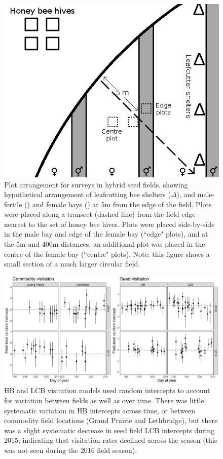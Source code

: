 \documentclass[12pt]{article} %
\begin{document}
\begin{figure}[h]
    \centering
    \includegraphics[width=\textwidth,keepaspectratio=true]{seedfieldPlots.png}
    \caption[Plot arrangement for surveys in hybrid seed fields]{Plot arrangement for surveys in hybrid seed fields, showing hypothetical arrangement of leafcutting bee shelters ($\Delta$), and male-fertile (\Hermaphrodite) and female bays (\Female) at 5m from the edge of the field. Plots were placed along a transect (dashed line) from the field edge nearest to the set of honey bee hives. Plots were placed side-by-side in the male bay and edge of the female bay (``edge" plots), and at the 5m and 400m distances, an additional plot was placed in the centre of the female bay (``centre" plots). Note: this figure shows a small section of a much larger circular field.}
\end{figure}

\begin{figure}[h]
    \centering
    \includegraphics[width=\textwidth,keepaspectratio=true]{both_beeInt_time.png}
    \caption[Visitation model intercepts over time]{HB and LCB visitation models used random intercepts to account for variation between fields as well as over time. There was little systematic variation in HB intercepts across time, or between commodity field locations (Grand Prairie and Lethbridge), but there was a slight systematic decrease in seed field LCB intercepts during 2015, indicating that visitation rates declined across the season (this was not seen during the 2016 field season).}
\end{figure}
\end{document}
